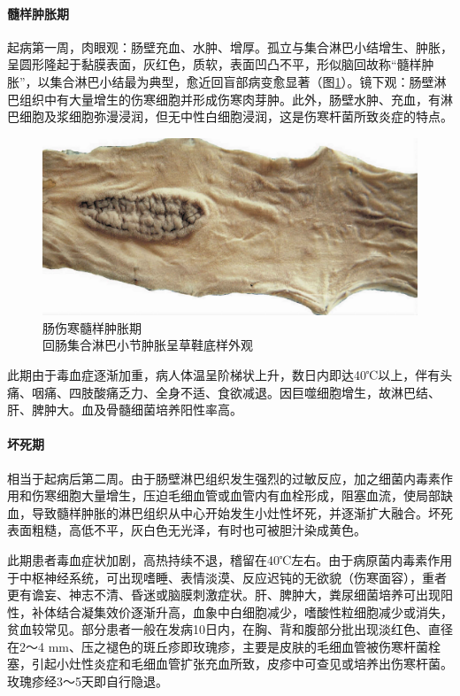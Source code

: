 \paragraph{髓样肿胀期}
起病第一周，肉眼观：肠壁充血、水肿、增厚。孤立与集合淋巴小结增生、肿胀，呈圆形隆起于黏膜表面，灰红色，质软，表面凹凸不平，形似脑回故称“髓样肿胀”，以集合淋巴小结最为典型，愈近回盲部病变愈显著（图\ref{fig14-13}）。镜下观：肠壁淋巴组织中有大量增生的伤寒细胞并形成伤寒肉芽肿。此外，肠壁水肿、充血，有淋巴细胞及浆细胞弥漫浸润，但无中性白细胞浸润，这是伤寒杆菌所致炎症的特点。

\begin{figure}[!htbp]
    \centering
    \includegraphics{./images/Image00238.jpg}
    \captionsetup{justification=centering}
    \caption{肠伤寒髓样肿胀期\\ {\small 回肠集合淋巴小节肿胀呈草鞋底样外观}}
    \label{fig14-13}
\end{figure}

此期由于毒血症逐渐加重，病人体温呈阶梯状上升，数日内即达40℃以上，伴有头痛、咽痛、四肢酸痛乏力、全身不适、食欲减退。因巨噬细胞增生，故淋巴结、肝、脾肿大。血及骨髓细菌培养阳性率高。

\paragraph{坏死期}
相当于起病后第二周。由于肠壁淋巴组织发生强烈的过敏反应，加之细菌内毒素作用和伤寒细胞大量增生，压迫毛细血管或血管内有血栓形成，阻塞血流，使局部缺血，导致髓样肿胀的淋巴组织从中心开始发生小灶性坏死，并逐渐扩大融合。坏死表面粗糙，高低不平，灰白色无光泽，有时也可被胆汁染成黄色。

此期患者毒血症状加剧，高热持续不退，稽留在40℃左右。由于病原菌内毒素作用于中枢神经系统，可出现嗜睡、表情淡漠、反应迟钝的无欲貌（伤寒面容），重者更有谵妄、神志不清、昏迷或脑膜刺激症状。肝、脾肿大，粪尿细菌培养可出现阳性，补体结合凝集效价逐渐升高，血象中白细胞减少，嗜酸性粒细胞减少或消失，贫血较常见。部分患者一般在发病10日内，在胸、背和腹部分批出现淡红色、直径在2～4
mm、压之褪色的斑丘疹即玫瑰疹，主要是皮肤的毛细血管被伤寒杆菌栓塞，引起小灶性炎症和毛细血管扩张充血所致，皮疹中可查见或培养出伤寒杆菌。玫瑰疹经3～5天即自行隐退。

